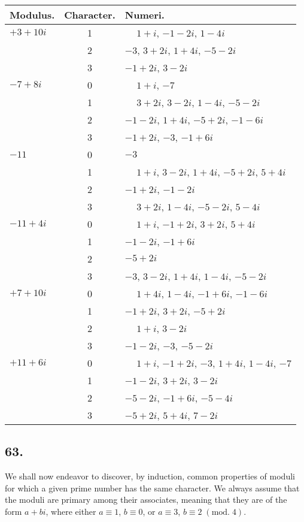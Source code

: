 \documentclass[twoside,12pt]{memoir}
\renewcommand{\pmod}[1]{\;(\textrm{mod.}\;#1)}
\begin{document}
\begin{center}
\begin{tabular}{l|c|l}
Modulus. & Character. & Numeri. \\
\hline
\(+3+10 i\) & 1 & \(\phantom{+}1+i\), \(-1-2 i\), \(1-4 i\) \\
 & 2 & \(-3\), \(3+2 i\), \(1+4 i\), \(-5-2 i\) \\
 & 3 & \(-1+2 i\), \(3-2 i\) \\
\(-7+8 i\) & 0 & \(\phantom{+}1+i\), \(-7\) \\
 & 1 & \(\phantom{+}3+2 i\), \(3-2 i\), \(1-4 i\), \(-5-2 i\) \\
 & 2 & \(-1-2 i\), \(1+4 i\), \(-5+2 i\), \(-1-6 i\) \\
 & 3 & \(-1+2 i\), \(-3\), \(-1+6 i\) \\
\(-11\) & 0 & \(-3\) \\
 & 1 & \(\phantom{+}1+i\), \(3-2 i\), \(1+4 i\), \(-5+2 i\), \(5+4 i\) \\
 & 2 & \(-1+2 i\), \(-1-2 i\) \\
 & 3 & \(\phantom{+}3+2 i\), \(1-4 i\), \(-5-2 i\), \(5-4 i\) \\
\(-11+4 i\) & 0 & \(\phantom{+}1+i\), \(-1+2 i\), \(3+2 i\), \(5+4 i\) \\
 & 1 & \(-1-2 i\), \(-1+6 i\) \\
 & 2 & \(-5+2 i\) \\
 & 3 & \(-3\), \(3-2 i\), \(1+4 i\), \(1-4 i\), \(-5-2 i\) \\
\(+7+10 i\) & 0 & \(\phantom{+}1+4 i\), \(1-4 i\), \(-1+6 i\), \(-1-6 i\) \\
 & 1 & \(-1+2 i\), \(3+2 i\), \(-5+2 i\) \\
 & 2 & \(\phantom{+}1+i\), \(3-2 i\) \\
 & 3 & \(-1-2 i\), \(-3\), \(-5-2 i\) \\
\(+11+6 i\) & 0 & \(\phantom{+}1+i\), \(-1+2 i\), \(-3\), \(1+4 i\), \(1-4 i\), \(-7\) \\
 & 1 & \(-1-2 i\), \(3+2 i\), \(3-2 i\) \\
 & 2 & \(-5-2 i\), \(-1+6 i\), \(-5-4 i\) \\
 & 3 & \(-5+2 i\), \(5+4 i\), \(7-2 i\) \\
\end{tabular}
\end{center}

\subsection*{63.}

We shall now endeavor to discover, by induction, common properties of moduli for which a given prime number has the same character.  We always assume that the moduli are primary among their associates, meaning that they are of the form \(a+b i\), where either \(a \equiv 1\), \(b \equiv 0\), or \(a \equiv 3\), \(b \equiv 2\pmod{4}\).
\end{document}
